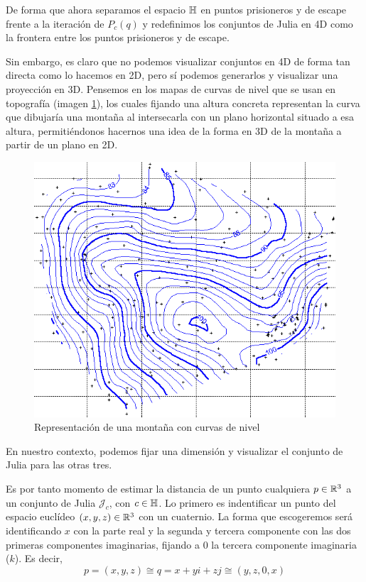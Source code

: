 De forma que ahora separamos el espacio $\mathbb{H}$ en puntos prisioneros y de escape frente a la iteración de $P_c(q)$ y redefinimos los conjuntos de Julia en 4D como la frontera entre los puntos prisioneros y de escape. 

Sin embargo, es claro que no podemos visualizar conjuntos en 4D de forma tan directa como lo hacemos en 2D, pero sí podemos generarlos y visualizar una proyección en 3D. Pensemos en los mapas de curvas de nivel que se usan en topografía (imagen \ref{fig:curva-de-nivel}), los cuales fijando una altura concreta representan la curva que dibujaría una montaña al intersecarla con un plano horizontal situado a esa altura, permitiéndonos hacernos una idea de la forma en 3D de la montaña a partir de un plano en 2D. 

\begin{figure} [ht]
    \centering
    \includegraphics[scale = 0.3]{img/C8/curvas-de-nivel2.png}
    \caption{Representación de una montaña con curvas de nivel}
    \label{fig:curva-de-nivel}
\end{figure}

En nuestro contexto, podemos fijar una dimensión y visualizar el conjunto de Julia para las otras tres. 

Es por tanto momento de estimar la distancia de un punto cualquiera $p\in\mathbb{R}^3$ a un conjunto de Julia $\mathcal{J}_c$, con $c\in\mathbb{H}$. Lo primero es indentificar un punto del espacio euclídeo $(x,y,z)\in\mathbb{R}^3$ con un cuaternio. La forma que escogeremos será identificando $x$ con la parte real y la segunda y tercera componente con las dos primeras componentes imaginarias, fijando a $0$ la tercera componente imaginaria ($k$). Es decir,
\begin{equation}
    p=(x,y,z)\cong q = x + yi + zj \cong (y,z,0,x)
\end{equation}

